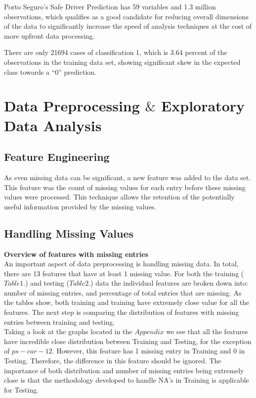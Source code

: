 \documentclass[fleqn,10pt]{SelfArx} %
\begin{document}
Porto Seguro’s Safe Driver Prediction has 59 variables and 1.3 million observations, which qualifies as a good candidate for reducing overall dimensions of the data to significantly increase the speed of analysis techniques at the cost of more upfront data processing.


There are only 21694 cases of classification 1, which is 3.64 percent of the observations in the training data set, showing significant skew in the expected class towards a ``0'' prediction.


\bigskip
\bigskip


\section{Data Preprocessing $\&$ Exploratory Data Analysis} %

\subsection{Feature Engineering}

As even missing data can be significant, a new feature was added to the data set. This feature was the count of missing values for each entry before these missing values were processed. This technique allows the retention of the potentially useful information provided by the missing values.
\subsection{Handling Missing Values}
\textbf{Overview of features with missing entries}\\
An important aspect of data preprocessing is handling missing data. In total, there are 13 features that have at least 1 missing value. For both the training ($Table 1.$) and testing ($Table 2.$) data the individual features are broken down into: number of missing entries, and percentage of total entries that are missing. As the tables show, both training and training have extremely close value for all the features. The next step is comparing the distribution of features with missing entries between training and testing.\\  
Taking a look at the graphs located in the $Appendix$ we see that all the features have incredible close distribution between Training and Testing, for the exception of $ps-car-12$. However, this feature has 1 missing entry in Training and 0 in Testing. Therefore, the difference in this feature should be ignored. The importance of both distribution and number of missing entries being extremely close is that the methodology developed to handle NA's in Training is applicable for Testing. \\
\\
\end{document}
